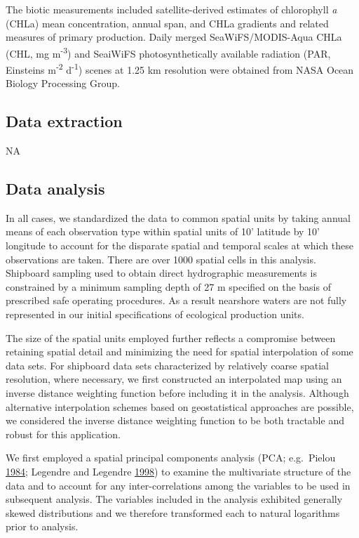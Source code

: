 \documentclass[
]{book}
\begin{document}
The biotic measurements included satellite-derived estimates of chlorophyll \emph{a} (CHLa) mean concentration, annual span, and CHLa gradients and related measures of primary production. Daily merged SeaWiFS/MODIS-Aqua CHLa (CHL, mg m\textsuperscript{-3}) and SeaiWiFS photosynthetically available radiation (PAR, Einsteins m\textsuperscript{-2} d\textsuperscript{-1}) scenes at 1.25 km resolution were obtained from NASA Ocean Biology Processing Group.

\hypertarget{data-extraction-12}{%
\subsection{Data extraction}\label{data-extraction-12}}

NA

\hypertarget{data-analysis-12}{%
\subsection{Data analysis}\label{data-analysis-12}}

In all cases, we standardized the data to common spatial units by taking annual means of each observation type within spatial units of 10' latitude by 10' longitude to account for the disparate spatial and temporal scales at which these observations are taken. There are over 1000 spatial cells in this analysis. Shipboard sampling used to obtain direct hydrographic measurements is constrained by a minimum sampling depth of 27 m specified on the basis of prescribed safe operating procedures. As a result nearshore waters are not fully represented in our initial specifications of ecological production units.

The size of the spatial units employed further reflects a compromise between retaining spatial detail and minimizing the need for spatial interpolation of some data sets. For shipboard data sets characterized by relatively coarse spatial resolution, where necessary, we first constructed an interpolated map using an inverse distance weighting function before including it in the analysis. Although alternative interpolation schemes based on geostatistical approaches are possible, we considered the inverse distance weighting function to be both tractable and robust for this application.

We first employed a spatial principal components analysis (PCA; e.g.~Pielou \protect\hyperlink{ref-Pielou1984}{1984}; Legendre and Legendre \protect\hyperlink{ref-Legendre1998}{1998}) to examine the multivariate structure of the data and to account for any inter-correlations among the variables to be used in subsequent analysis. The variables included in the analysis exhibited generally skewed distributions and we therefore transformed each to natural logarithms prior to analysis.
\end{document}
